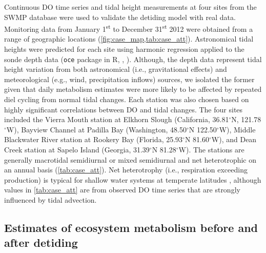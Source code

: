 \documentclass[letterpaper,12pt,oneside]{article}\usepackage[]{graphicx}\usepackage[]{color}
\begin{document}
Continuous \ac{DO} time series and tidal height measurements at four sites from the \ac{SWMP} database  were used to validate the detiding model with real data.  Monitoring data from January 1\textsuperscript{st} to December 31\textsuperscript{st} 2012 were obtained from a range of geographic locations (\cref{fig:case_map,tab:case_att}). Astronomical tidal heights were predicted for each site using harmonic regression applied to the sonde depth data (\texttt{oce} package in R, \citealt{Foreman89}, ). Although, the depth data represent tidal height variation from both astronomical (i.e., gravitational effects) and meteorological (e.g., wind, precipitation inflows) sources, we isolated the former given that daily metabolism estimates were more likely to be affected by repeated diel cycling from normal tidal changes.  Each station was also chosen based on highly significant correlations between \ac{DO} and tidal changes.  The four sites included the Vierra Mouth station at Elkhorn Slough (California, 36.81$^{\circ}$N, 121.78$^{\circ}$W), Bayview Channel at Padilla Bay (Washington, 48.50$^{\circ}$N 122.50$^{\circ}$W), Middle Blackwater River station at Rookery Bay (Florida, 25.93$^{\circ}$N 81.60$^{\circ}$W), and Dean Creek station at Sapelo Island (Georgia, 31.39$^{\circ}$N 81.28$^{\circ}$W).  The stations are generally macrotidal semidiurnal or mixed semidiurnal and net heterotrophic on an annual basis (\cref{tab:case_att}).  Net heterotrophy (i.e., respiration exceeding production) is typical for shallow water systems at temperate latitudes \citep{Caffrey03}, although values in \cref{tab:case_att} are from observed \ac{DO} time series that are strongly influenced by tidal advection.

\subsection{Estimates of ecosystem metabolism before and after detiding} \label{met_sec}
\end{document}
